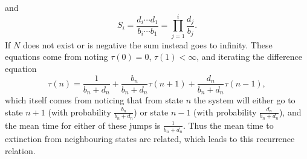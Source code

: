 and
\begin{equation}
S_i = \frac{d_i\cdots d_1}{b_i\cdots b_1} = \prod_{j=1}^{i}\frac{d_j}{b_j}. 
\end{equation}
If $N$ does not exist or is negative the sum instead goes to infinity. 
These equations come from noting $\tau(0)=0$, $\tau(1)<\infty$, and iterating the difference equation \cite{Nisbet1982,Palamara2013}
\begin{equation}
\tau(n) = \frac{1}{b_n+d_n} 
+ \frac{b_n}{b_n+d_n}\tau(n+1) 
+ \frac{d_n}{b_n+d_n}\tau(n-1),
 \label{mte-recurrence}
\end{equation}
which itself comes from noticing that from state $n$ the system will either go to state $n+1$ (with probability $\frac{b_n}{b_n+d_n}$) or state $n-1$ (with probability $\frac{d_n}{b_n+d_n}$), and the mean time for either of these jumps is $\frac{1}{b_n+d_n}$. 
Thus the mean time to extinction from neighbouring states are related, which leads to this recurrence relation. 

